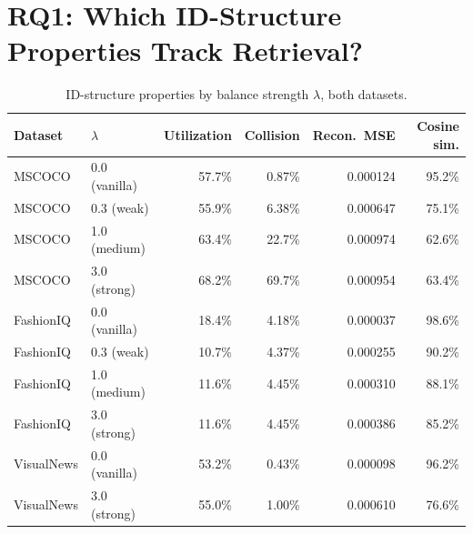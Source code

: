 \section{RQ1: Which ID-Structure Properties Track Retrieval?}
\label{sec:rq1}

\begin{table}[t]
\centering
\caption{ID-structure properties by balance strength $\lambda$, both datasets.}
\label{tab:table1}
\footnotesize
\begin{tabular}{@{}llrrrr@{}}
\toprule
Dataset & $\lambda$ & Utilization & Collision & Recon.\ MSE & Cosine sim.\\
\midrule
MSCOCO    & 0.0 (vanilla) & 57.7\% & 0.87\% & 0.000124 & 95.2\% \\
MSCOCO    & 0.3 (weak)    & 55.9\% & 6.38\% & 0.000647 & 75.1\% \\
MSCOCO    & 1.0 (medium)  & 63.4\% & 22.7\% & 0.000974 & 62.6\% \\
MSCOCO    & 3.0 (strong)  & 68.2\% & 69.7\% & 0.000954 & 63.4\% \\
\midrule
FashionIQ & 0.0 (vanilla) & 18.4\% & 4.18\% & 0.000037 & 98.6\% \\
FashionIQ & 0.3 (weak)    & 10.7\% & 4.37\% & 0.000255 & 90.2\% \\
FashionIQ & 1.0 (medium)  & 11.6\% & 4.45\% & 0.000310 & 88.1\% \\
FashionIQ & 3.0 (strong)  & 11.6\% & 4.45\% & 0.000386 & 85.2\% \\
\midrule
VisualNews & 0.0 (vanilla) & 53.2\% & 0.43\% & 0.000098 & 96.2\% \\
VisualNews & 3.0 (strong)  & 55.0\% & 1.00\% & 0.000610 & 76.6\% \\
\bottomrule
\end{tabular}
\end{table}

